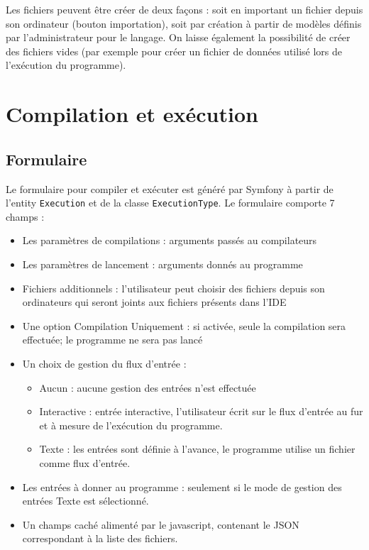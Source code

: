 Les fichiers peuvent être créer de deux façons : soit en important un fichier depuis son ordinateur (bouton importation), soit par création à partir de modèles définis par l'administrateur pour le langage.
On laisse également la possibilité de créer des fichiers vides (par exemple pour créer un fichier de données utilisé lors de l'exécution du programme).


\section{Compilation et exécution}

\subsection{Formulaire}

Le formulaire pour compiler et exécuter est généré par Symfony à partir de l'entity \texttt{Execution} et de la classe \texttt{ExecutionType}. Le formulaire comporte 7 champs :
\begin{itemize}
  \item Les paramètres de compilations : arguments passés au compilateurs
  \item Les paramètres de lancement : arguments donnés au programme
  \item Fichiers additionnels : l'utilisateur peut choisir des fichiers depuis son ordinateurs qui seront joints aux fichiers présents dans l'IDE
  \item Une option Compilation Uniquement : si activée, seule la compilation sera effectuée; le programme ne sera pas lancé
  \item{ Un choix de gestion du flux d'entrée :
  \begin{itemize}
    \item Aucun : aucune gestion des entrées n'est effectuée
    \item Interactive : entrée interactive, l'utilisateur écrit sur le flux d'entrée au fur et à mesure de l'exécution du programme.
    \item Texte : les entrées sont définie à l'avance, le programme utilise un fichier comme flux d'entrée.
  \end{itemize}}
  \item Les entrées à donner au programme : seulement si le mode de gestion des entrées Texte est sélectionné.
  \item Un champs caché alimenté par le javascript, contenant le JSON correspondant à la liste des fichiers.
\end{itemize}

